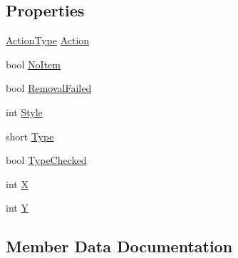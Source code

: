 \subsection*{Properties}
\begin{DoxyCompactItemize}
\item 
\hyperlink{namespaceOTA_1_1ID_a1f5264d1d5ca29e0f8e2eb23fc7271ed}{Action\+Type} \hyperlink{structOTA_1_1Plugin_1_1HookArgs_1_1PlayerWorldAlteration_a83f49f18996a7b98657455bfd5a756c3}{Action}
\item 
bool \hyperlink{structOTA_1_1Plugin_1_1HookArgs_1_1PlayerWorldAlteration_aaa473ca10d649fdc815805295b159500}{No\+Item}
\item 
bool \hyperlink{structOTA_1_1Plugin_1_1HookArgs_1_1PlayerWorldAlteration_a975468ac3ad856faae77087388f9f85d}{Removal\+Failed}
\item 
int \hyperlink{structOTA_1_1Plugin_1_1HookArgs_1_1PlayerWorldAlteration_a5e292d267b701f3cdcd1f3255caffe9c}{Style}
\item 
short \hyperlink{structOTA_1_1Plugin_1_1HookArgs_1_1PlayerWorldAlteration_aa02da188f87622ef697b7ae23a753d55}{Type}
\item 
bool \hyperlink{structOTA_1_1Plugin_1_1HookArgs_1_1PlayerWorldAlteration_a2817266702c8d326204bfe1e294199f3}{Type\+Checked}
\item 
int \hyperlink{structOTA_1_1Plugin_1_1HookArgs_1_1PlayerWorldAlteration_a80c0944640e62d3ed6c5419c1bcc0c88}{X}
\item 
int \hyperlink{structOTA_1_1Plugin_1_1HookArgs_1_1PlayerWorldAlteration_aa482c4cc86a24474e4fb19b5b5978778}{Y}
\end{DoxyCompactItemize}


\subsection{Member Data Documentation}
\hypertarget{structOTA_1_1Plugin_1_1HookArgs_1_1PlayerWorldAlteration_a9d6244e97aa5bde81da59b668a3a858c}{}
